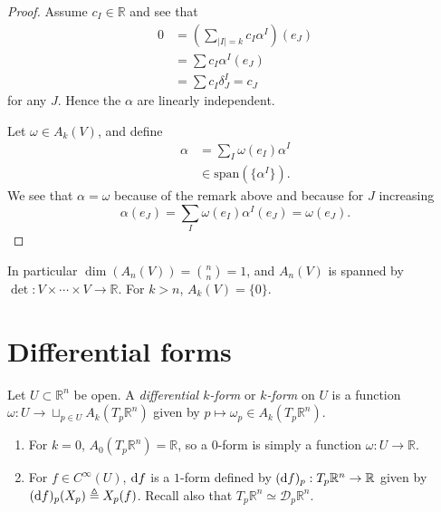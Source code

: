\begin{proof}
Assume $c_I \in \mathbb{R}$ and see that
\begin{align*}
   0
&= \left(\sum_{|I|=k} c_I \alpha^I\right)(e_J) \\
&= \sum c_I \alpha^I(e_J) \\
&= \sum c_I \delta^I_J = c_J
\end{align*}
for any $J$. Hence the $\alpha$ are linearly independent.

Let $\omega \in A_k(V)$, and define
\begin{align*}
     \alpha
&=   \sum_I \omega(e_I) \alpha^I \\
&\in \mathrm{span}(\{ \alpha^I \}).
\end{align*}
We see that $\alpha = \omega$ because of the remark above and because
for $J$ increasing
$$
  \alpha(e_J)
= \sum_I \omega(e_I) \alpha^I(e_J)
= \omega(e_J).
$$
\end{proof}

In particular $\dim(A_n(V)) = {n \choose n} = 1$, and $A_n(V)$ is
spanned by $\det: V \times \cdots \times V \to \mathbb{R}$.
For $k > n$, $A_k(V) = \{ 0 \}$.

\section*{Differential forms}

\begin{defn}
Let $U \subset \mathbb{R}^n$ be open. A \emph{differential $k$-form}
or \emph{$k$-form} on $U$ is a function
$\omega : U \to \sqcup_{p \in U} A_k(T_p \mathbb{R}^n)$ given by
$p \mapsto \omega_p \in A_k(T_p \mathbb{R}^n)$.
\end{defn}

\begin{xmpl}

  \begin{enumerate}
    \item{
       For $k = 0$,
       $A_0(T_p \mathbb{R}^n) = \mathbb{R}$, so a $0$-form is simply a
       function $\omega: U \to \mathbb{R}$.
    }
    \item{
      For $f \in C^\infty(U)$, $\mathop{}\!\mathrm{d} f$ is a $1$-form defined by
      $(\mathop{}\!\mathrm{d} f)_p : T_p \mathbb{R}^n \to \mathbb{R}$ given by
      $(\mathop{}\!\mathrm{d} f)_p (X_p) \triangleq X_p(f)$. Recall also that
      $T_p \mathbb{R}^n \simeq \mathcal{D}_p \mathbb{R}^n$.
    }
  \end{enumerate}
\end{xmpl}

